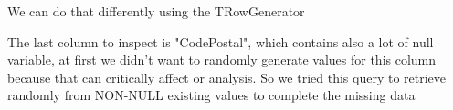 We can do that differently using the TRowGenerator
\begin{figure}[H]
\centering
{}
\end{figure}
\begin{figure}[H]
\centering
{}
\end{figure}

The last column to inspect is "CodePostal", which contains also a lot of null variable, at first we didn't want to randomly generate values for this column because that can critically affect or analysis.
\vskip0.2cm 
So we tried this query to retrieve randomly from NON-NULL existing values to complete the missing data
\begin{figure}[H]
\centering
{}
\end{figure}

